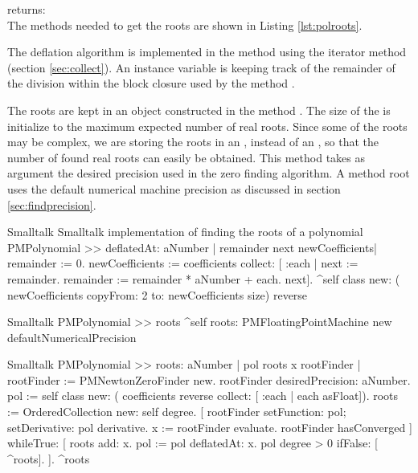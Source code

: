 returns:  \\

The methods needed to get the roots are shown in Listing \ref{lst:polroots}.

The deflation algorithm is implemented in the method  using the iterator method  (\cf section \ref{sec:collect}).
An instance variable is keeping track of the remainder of the division within the block closure used by the
method .

The roots are kept in an  object
constructed in the method . The size of the  is initialize to the maximum expected number of
real roots. Since some of the roots may be complex, we are storing
the roots in an , instead of an , so that the number of found real roots can easily be
obtained. This method takes as argument the desired precision used
in the zero finding algorithm. A method root uses the default
numerical machine precision as discussed in section
\ref{sec:findprecision}.

\begin{listing}[label=lst:polroots]{Smalltalk}
{Smalltalk implementation of finding the roots of a polynomial}
PMPolynomial >> deflatedAt: aNumber
    | remainder next newCoefficients|
    remainder := 0.
    newCoefficients := coefficients collect:
                        [ :each |
                          next := remainder. 
                          remainder := remainder * aNumber + each.
                          next].
    ^self class new: ( newCoefficients copyFrom: 2 to: 
                                         newCoefficients size) reverse
\end{listing}

\begin{displaycode}{Smalltalk}
PMPolynomial >> roots
    ^self roots: PMFloatingPointMachine new 
                                             defaultNumericalPrecision
\end{displaycode}

\begin{displaycode}{Smalltalk}
PMPolynomial >> roots: aNumber
    | pol roots x rootFinder |
    rootFinder := PMNewtonZeroFinder new.
    rootFinder desiredPrecision: aNumber.
    pol := self class new: ( coefficients reverse collect: [ :each | 
                                                       each asFloat]).
    roots := OrderedCollection new: self degree.
    [ rootFinder setFunction: pol; setDerivative: pol derivative.
      x := rootFinder evaluate.
      rootFinder hasConverged
        ] whileTrue: [ roots add: x. 
                       pol := pol deflatedAt: x. 
                       pol degree > 0
                         ifFalse: [ ^roots].
                     ].
    ^roots
\end{displaycode}

